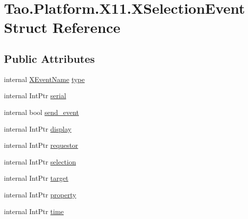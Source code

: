 \hypertarget{struct_tao_1_1_platform_1_1_x11_1_1_x_selection_event}{
\section{Tao.Platform.X11.XSelectionEvent Struct Reference}
\label{struct_tao_1_1_platform_1_1_x11_1_1_x_selection_event}
}
\subsection*{Public Attributes}
\begin{DoxyCompactItemize}
\item 
internal \hyperlink{namespace_tao_1_1_platform_1_1_x11_aff81ed5b8778e1ea8e872861dff9f146}{XEventName} \hyperlink{struct_tao_1_1_platform_1_1_x11_1_1_x_selection_event_a17fd40318880e1c501342b8fdca2b3af}{type}
\item 
internal IntPtr \hyperlink{struct_tao_1_1_platform_1_1_x11_1_1_x_selection_event_abb04b0d9ea00185ed2d9418d4f5c1135}{serial}
\item 
internal bool \hyperlink{struct_tao_1_1_platform_1_1_x11_1_1_x_selection_event_aa4361b2d9ddb7869cab146e4b72e066e}{send\_\-event}
\item 
internal IntPtr \hyperlink{struct_tao_1_1_platform_1_1_x11_1_1_x_selection_event_a4e01807ca758d1a642aaa5360143c6e8}{display}
\item 
internal IntPtr \hyperlink{struct_tao_1_1_platform_1_1_x11_1_1_x_selection_event_addb40acc81cf190640e17f538383ceed}{requestor}
\item 
internal IntPtr \hyperlink{struct_tao_1_1_platform_1_1_x11_1_1_x_selection_event_afa55c998e8365437cad6e65d816bc117}{selection}
\item 
internal IntPtr \hyperlink{struct_tao_1_1_platform_1_1_x11_1_1_x_selection_event_ac17bd52ab385e2ddc79841f7d11ecf6d}{target}
\item 
internal IntPtr \hyperlink{struct_tao_1_1_platform_1_1_x11_1_1_x_selection_event_a01e8a896e5a918bb1882bf3b5344d602}{property}
\item 
internal IntPtr \hyperlink{struct_tao_1_1_platform_1_1_x11_1_1_x_selection_event_a50fc5d43a7395cacd644014412cead4d}{time}
\end{DoxyCompactItemize}


